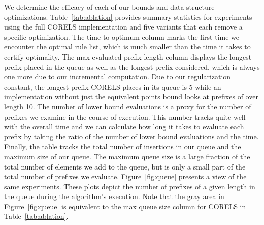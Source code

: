 We determine the efficacy of each of our bounds and data structure optimizations.
%
Table~\ref{tab:ablation} provides summary statistics for experiments using the full
CORELS implementation and five variants that each remove a specific optimization.
%
The time to optimum column marks the first time we encounter the optimal rule list, 
which is much smaller than the time it takes to certify optimality.
%
The max evaluated prefix length column displays the longest prefix placed in the queue
as well as the longest prefix considered, which is always one more due to our incremental
computation.
%
Due to our regularization constant, the longest prefix CORELS places in its queue is
5 while an implementation without just the equivalent points bound looks at prefixes of over
length 10.
%
The number of lower bound evaluations is a proxy for the number of prefixes we examine in the 
course of execution.
%
This number tracks quite well with the overall time and we can calculate how long it takes to 
evaluate each prefix by taking the ratio of the number of lower bound evaluations and the time.
%
Finally, the table tracks the total number of insertions in our queue and the maximum size of our queue.
%
The maximum queue size is a large fraction of the total number of elements we add to the queue, but is 
only a small part of the total number of prefixes we evaluate.
%
Figure~\ref{fig:queue} presents a view of the same experiments.
%
These plots depict the number of prefixes of a given length in the queue
during the algorithm's execution.
%
Note that the gray area in Figure~\ref{fig:queue} is equivalent to the max queue size column for
CORELS in Table~\ref{tab:ablation}.

